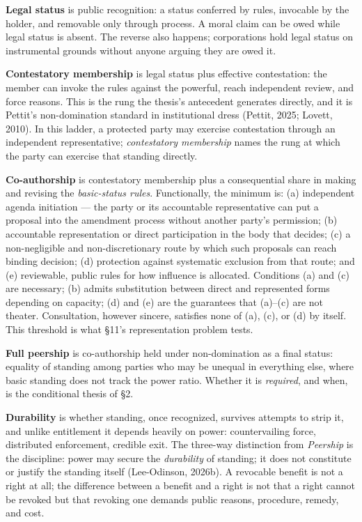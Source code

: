 \documentclass[
  11pt,
  letterpaper,
]{article}
\begin{document}
\textbf{Legal status} is public recognition: a status conferred by
rules, invocable by the holder, and removable only through process. A
moral claim can be owed while legal status is absent. The reverse also
happens; corporations hold legal status on instrumental grounds without
anyone arguing they are owed it.

\textbf{Contestatory membership} is legal status plus effective
contestation: the member can invoke the rules against the powerful,
reach independent review, and force reasons. This is the rung the
thesis's antecedent generates directly, and it is Pettit's
non-domination standard in institutional dress (Pettit, 2025; Lovett,
2010). In this ladder, a protected party may exercise contestation
through an independent representative; \emph{contestatory membership}
names the rung at which the party can exercise that standing directly.

\textbf{Co-authorship} is contestatory membership plus a consequential
share in making and revising the \emph{basic-status rules}.
Functionally, the minimum is: (a) independent agenda initiation --- the
party or its accountable representative can put a proposal into the
amendment process without another party's permission; (b) accountable
representation or direct participation in the body that decides; (c) a
non-negligible and non-discretionary route by which such proposals can
reach binding decision; (d) protection against systematic exclusion from
that route; and (e) reviewable, public rules for how influence is
allocated. Conditions (a) and (c) are necessary; (b) admits substitution
between direct and represented forms depending on capacity; (d) and (e)
are the guarantees that (a)--(c) are not theater. Consultation, however
sincere, satisfies none of (a), (c), or (d) by itself. This threshold is
what §11's representation problem tests.

\textbf{Full peership} is co-authorship held under non-domination as a
final status: equality of standing among parties who may be unequal in
everything else, where basic standing does not track the power ratio.
Whether it is \emph{required}, and when, is the conditional thesis of
§2.

\textbf{Durability} is whether standing, once recognized, survives
attempts to strip it, and unlike entitlement it depends heavily on
power: countervailing force, distributed enforcement, credible exit. The
three-way distinction from \emph{Peership} is the discipline: power may
secure the \emph{durability} of standing; it does not constitute or
justify the standing itself (Lee-Odinson, 2026b). A revocable benefit is
not a right at all; the difference between a benefit and a right is not
that a right cannot be revoked but that revoking one demands public
reasons, procedure, remedy, and cost.
\end{document}

